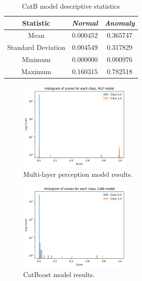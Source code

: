 \begin{table}[htbp]
    \caption{CatB model descriptive statistics}\label{tab3}
    \begin{center}
        \begin{tabular}{c c c}
            \toprule            
            \textbf{Statistic}  & \textbf{\textit{Normal}} & \textbf{\textit{Anomaly}}\\
            \midrule
            Mean & 0.000452 & 0.365747 \\
            Standard Deviation & 0.004549 & 0.317829 \\
            Minimum &0.000000 & 0.000976 \\
            Maximum &0.160315& 0.782518 \\
            \bottomrule
        \end{tabular}
    \end{center}
\end{table}
        

\begin{figure}[htbp]
    \centerline{\includegraphics[width=0.5\textwidth]{resources/ch3/fig1.png}}
    \caption{Multi-layer perception model results.}\label{fig1}
\end{figure}


\begin{figure}[htbp]
    \centerline{\includegraphics[width=0.5\textwidth]{resources/ch3/fig2.png}}
    \caption{CatBoost model results.}\label{fig2}
\end{figure}


